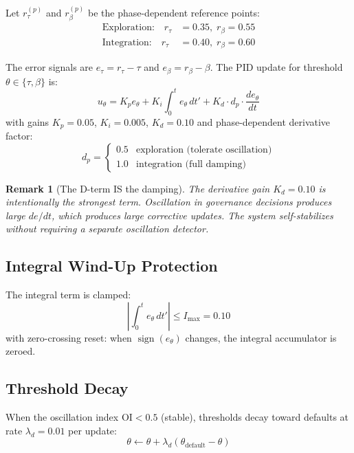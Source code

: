 \documentclass[11pt,twocolumn]{article}
\newtheorem{remark}[theorem]{Remark}
\begin{document}
Let $r_\tau^{(p)}$ and $r_\beta^{(p)}$ be the phase-dependent
reference points:
\begin{align}
  \text{Exploration:} \quad r_\tau &= 0.35,\; r_\beta = 0.55 \\
  \text{Integration:} \quad r_\tau &= 0.40,\; r_\beta = 0.60
\end{align}

The error signals are $e_\tau = r_\tau - \tau$ and
$e_\beta = r_\beta - \beta$. The PID update for threshold $\theta
\in \{\tau, \beta\}$ is:
\begin{equation}
  u_\theta = K_p e_\theta + K_i \int_0^t e_\theta\,dt'
  + K_d \cdot d_p \cdot \frac{de_\theta}{dt}
  \label{eq:pid}
\end{equation}
with gains $K_p = 0.05$, $K_i = 0.005$, $K_d = 0.10$ and
phase-dependent derivative factor:
\begin{equation}
  d_p = \begin{cases}
    0.5 & \text{exploration (tolerate oscillation)} \\
    1.0 & \text{integration (full damping)}
  \end{cases}
  \label{eq:d-factor}
\end{equation}

\begin{remark}[The D-term IS the damping]
The derivative gain $K_d = 0.10$ is intentionally the strongest term.
Oscillation in governance decisions produces large $de/dt$, which
produces large corrective updates. The system self-stabilizes without
requiring a separate oscillation detector.
\end{remark}

\subsection{Integral Wind-Up Protection}

The integral term is clamped:
\begin{equation}
  \left|\int_0^t e_\theta\,dt'\right| \leq I_{\max} = 0.10
  \label{eq:windup}
\end{equation}
with zero-crossing reset: when $\operatorname{sign}(e_\theta)$ changes,
the integral accumulator is zeroed.

\subsection{Threshold Decay}

When the oscillation index $\text{OI} < 0.5$ (stable), thresholds
decay toward defaults at rate $\lambda_d = 0.01$ per update:
\begin{equation}
  \theta \leftarrow \theta + \lambda_d(\theta_{\text{default}} - \theta)
  \label{eq:decay}
\end{equation}
\end{document}

